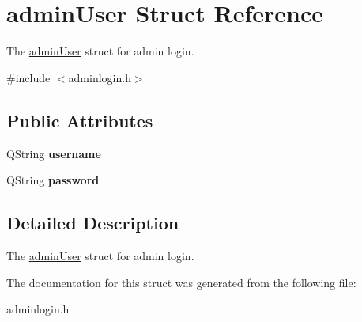 \hypertarget{structadmin_user}{}\section{admin\+User Struct Reference}
\label{structadmin_user}


The \hyperlink{structadmin_user}{admin\+User} struct for admin login.  




{\ttfamily \#include $<$adminlogin.\+h$>$}

\subsection*{Public Attributes}
\begin{DoxyCompactItemize}
\item 
\mbox{\label{structadmin_user_a13bf29c825d552c1eaab62584796f818}} 
Q\+String {\bfseries username}
\item 
\mbox{\label{structadmin_user_aa444478d445577e13b3744f342fce4b0}} 
Q\+String {\bfseries password}
\end{DoxyCompactItemize}


\subsection{Detailed Description}
The \hyperlink{structadmin_user}{admin\+User} struct for admin login. 

The documentation for this struct was generated from the following file\+:\begin{DoxyCompactItemize}
\item 
adminlogin.\+h\end{DoxyCompactItemize}
